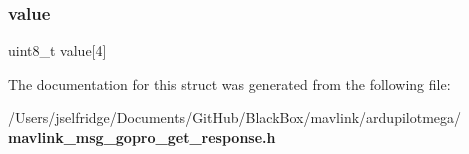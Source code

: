 \mbox{\label{struct____mavlink__gopro__get__response__t_ab6205fee79f7e2b59ea91c21e6152b94}} 
\subsubsection{value}
{\footnotesize\ttfamily uint8\+\_\+t value[4]}



The documentation for this struct was generated from the following file\+:\begin{DoxyCompactItemize}
\item 
/\+Users/jselfridge/\+Documents/\+Git\+Hub/\+Black\+Box/mavlink/ardupilotmega/\textbf{ mavlink\+\_\+msg\+\_\+gopro\+\_\+get\+\_\+response.\+h}\end{DoxyCompactItemize}
